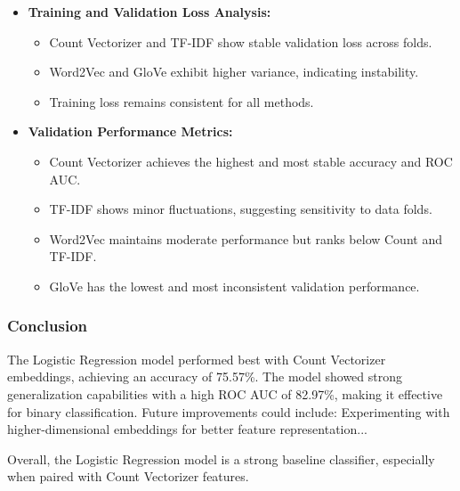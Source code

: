 \begin{itemize}
    \item \textbf{Training and Validation Loss Analysis:}
    \begin{itemize}
        \item Count Vectorizer and TF-IDF show stable validation loss across folds.
        \item Word2Vec and GloVe exhibit higher variance, indicating instability.
        \item Training loss remains consistent for all methods.
    \end{itemize}
    
    \item \textbf{Validation Performance Metrics:}
    \begin{itemize}
        \item Count Vectorizer achieves the highest and most stable accuracy and ROC AUC.
        \item TF-IDF shows minor fluctuations, suggesting sensitivity to data folds.
        \item Word2Vec maintains moderate performance but ranks below Count and TF-IDF.
        \item GloVe has the lowest and most inconsistent validation performance.
    \end{itemize}
\end{itemize}

\subsubsection{Conclusion}

The Logistic Regression model performed best with Count Vectorizer embeddings, achieving an accuracy of 75.57\%. The model showed strong generalization capabilities with a high ROC AUC of 82.97\%, making it effective for binary classification. Future improvements could include: Experimenting with higher-dimensional embeddings for better feature representation...

Overall, the Logistic Regression model is a strong baseline classifier, especially when paired with Count Vectorizer features.


